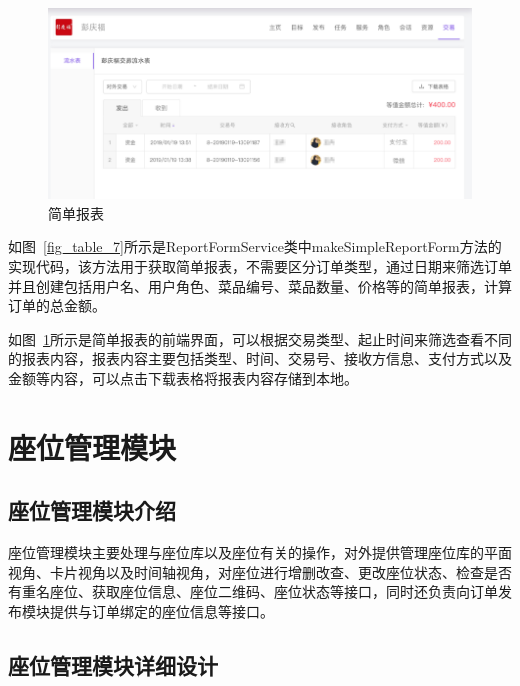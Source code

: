 \begin{figure}[htbp!]
    \centering
    \includegraphics[width=\linewidth]{FIGs/chapter4/table_figure.pdf}
    \caption{简单报表}\label{fig_table_figure}
\end{figure}

如图~\ref{fig_table_7}所示是ReportFormService类中makeSimpleReportForm方法的实现代码，该方法用于获取简单报表，不需要区分订单类型，通过日期来筛选订单并且创建包括用户名、用户角色、菜品编号、菜品数量、价格等的简单报表，计算订单的总金额。

如图~\ref{fig_table_figure}所示是简单报表的前端界面，可以根据交易类型、起止时间来筛选查看不同的报表内容，报表内容主要包括类型、时间、交易号、接收方信息、支付方式以及金额等内容，可以点击下载表格将报表内容存储到本地。\\

\section{座位管理模块}
\subsection{座位管理模块介绍}
座位管理模块主要处理与座位库以及座位有关的操作，对外提供管理座位库的平面视角、卡片视角以及时间轴视角，对座位进行增删改查、更改座位状态、检查是否有重名座位、获取座位信息、座位二维码、座位状态等接口，同时还负责向订单发布模块提供与订单绑定的座位信息等接口。\\

\subsection{座位管理模块详细设计}

